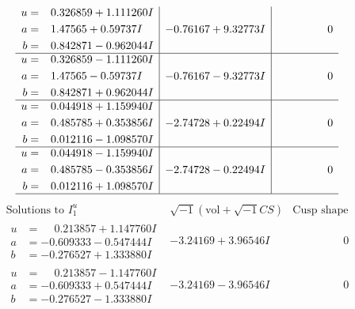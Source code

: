 \documentclass[1p]{elsarticle_modified}
\theoremstyle{definition}
\newcommand{\I}{\sqrt{-1}}
\begin{document}
$$\begin{array}{c|c|c}
\begin{aligned}
u &= \phantom{-}0.326859 + 1.111260 I \\
a &= \phantom{-}1.47565 + 0.59737 I \\
b &= \phantom{-}0.842871 - 0.962044 I\end{aligned}
 & -0.76167 + 9.32773 I & \phantom{-0.000000 } 0 \\ \hline\begin{aligned}
u &= \phantom{-}0.326859 - 1.111260 I \\
a &= \phantom{-}1.47565 - 0.59737 I \\
b &= \phantom{-}0.842871 + 0.962044 I\end{aligned}
 & -0.76167 - 9.32773 I & \phantom{-0.000000 } 0 \\ \hline\begin{aligned}
u &= \phantom{-}0.044918 + 1.159940 I \\
a &= \phantom{-}0.485785 + 0.353856 I \\
b &= \phantom{-}0.012116 - 1.098570 I\end{aligned}
 & -2.74728 + 0.22494 I & \phantom{-0.000000 } 0 \\ \hline\begin{aligned}
u &= \phantom{-}0.044918 - 1.159940 I \\
a &= \phantom{-}0.485785 - 0.353856 I \\
b &= \phantom{-}0.012116 + 1.098570 I\end{aligned}
 & -2.74728 - 0.22494 I & \phantom{-0.000000 } 0\\
 \hline 
 \end{array}$$\newpage$$\begin{array}{c|c|c}  
\text{Solutions to }I^u_{1}& \I (\text{vol} + \sqrt{-1}CS) & \text{Cusp shape}\\
 \hline 
\begin{aligned}
u &= \phantom{-}0.213857 + 1.147760 I \\
a &= -0.609333 - 0.547444 I \\
b &= -0.276527 + 1.333880 I\end{aligned}
 & -3.24169 + 3.96546 I & \phantom{-0.000000 } 0 \\ \hline\begin{aligned}
u &= \phantom{-}0.213857 - 1.147760 I \\
a &= -0.609333 + 0.547444 I \\
b &= -0.276527 - 1.333880 I\end{aligned}
 & -3.24169 - 3.96546 I & \phantom{-0.000000 } 0 \\ \hline\begin{aligned}

\end{aligned}
\end{array}$$
\end{document}
